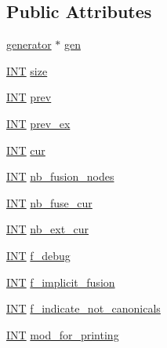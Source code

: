 \subsection*{Public Attributes}
\begin{DoxyCompactItemize}
\item 
\mbox{\hyperlink{classgenerator}{generator}} $\ast$ \mbox{\hyperlink{classupstep__work_a07dc71a04cd45e96bc4e82bd0c268adf}{gen}}
\item 
\mbox{\hyperlink{galois_8h_a09fddde158a3a20bd2dcadb609de11dc}{I\+NT}} \mbox{\hyperlink{classupstep__work_af18b0e9289fb421db595ad553f274746}{size}}
\item 
\mbox{\hyperlink{galois_8h_a09fddde158a3a20bd2dcadb609de11dc}{I\+NT}} \mbox{\hyperlink{classupstep__work_a50aad3cf96f11237307499499d2b5015}{prev}}
\item 
\mbox{\hyperlink{galois_8h_a09fddde158a3a20bd2dcadb609de11dc}{I\+NT}} \mbox{\hyperlink{classupstep__work_ac7d8499bcc7c811b60d6226ddc97f91c}{prev\+\_\+ex}}
\item 
\mbox{\hyperlink{galois_8h_a09fddde158a3a20bd2dcadb609de11dc}{I\+NT}} \mbox{\hyperlink{classupstep__work_a0694546995210ad7623f9489c968ec29}{cur}}
\item 
\mbox{\hyperlink{galois_8h_a09fddde158a3a20bd2dcadb609de11dc}{I\+NT}} \mbox{\hyperlink{classupstep__work_a2c14c1ef9da337295152e139ec91292f}{nb\+\_\+fusion\+\_\+nodes}}
\item 
\mbox{\hyperlink{galois_8h_a09fddde158a3a20bd2dcadb609de11dc}{I\+NT}} \mbox{\hyperlink{classupstep__work_a02ad1f4fe22e4581c48027fb967145cd}{nb\+\_\+fuse\+\_\+cur}}
\item 
\mbox{\hyperlink{galois_8h_a09fddde158a3a20bd2dcadb609de11dc}{I\+NT}} \mbox{\hyperlink{classupstep__work_a6b017c3e07812bfb1701026f8e538960}{nb\+\_\+ext\+\_\+cur}}
\item 
\mbox{\hyperlink{galois_8h_a09fddde158a3a20bd2dcadb609de11dc}{I\+NT}} \mbox{\hyperlink{classupstep__work_a133f2e2d6ed5c93117b6a902bd317b0b}{f\+\_\+debug}}
\item 
\mbox{\hyperlink{galois_8h_a09fddde158a3a20bd2dcadb609de11dc}{I\+NT}} \mbox{\hyperlink{classupstep__work_a4c5dc44c133b720b1521f0c63c1e2859}{f\+\_\+implicit\+\_\+fusion}}
\item 
\mbox{\hyperlink{galois_8h_a09fddde158a3a20bd2dcadb609de11dc}{I\+NT}} \mbox{\hyperlink{classupstep__work_a15919737eb778195080e41cd7c321226}{f\+\_\+indicate\+\_\+not\+\_\+canonicals}}
\item 
\mbox{\hyperlink{galois_8h_a09fddde158a3a20bd2dcadb609de11dc}{I\+NT}} \mbox{\hyperlink{classupstep__work_a72467f4ed5527be54c8246b76c12c028}{mod\+\_\+for\+\_\+printing}}

\end{DoxyCompactItemize}
